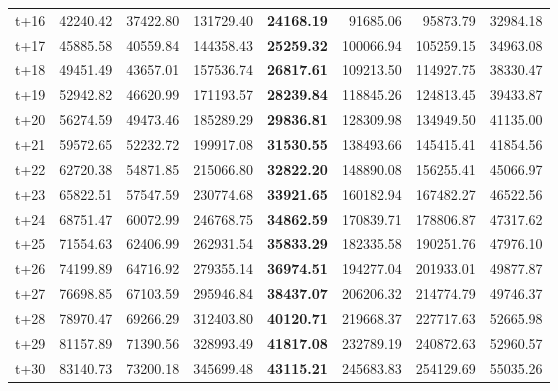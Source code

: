 \begin{table}[H]
\begin{tabular}{lrrrrrrr}
t+16  & 42240.42  & 37422.80  & 131729.40  & \textbf{24168.19}  & 91685.06  & 95873.79  & 32984.18  \\
t+17  & 45885.58  & 40559.84  & 144358.43  & \textbf{25259.32}  & 100066.94  & 105259.15  & 34963.08  \\
t+18  & 49451.49  & 43657.01  & 157536.74  & \textbf{26817.61}  & 109213.50  & 114927.75  & 38330.47  \\
t+19  & 52942.82  & 46620.99  & 171193.57  & \textbf{28239.84}  & 118845.26  & 124813.45  & 39433.87  \\
t+20  & 56274.59  & 49473.46  & 185289.29  & \textbf{29836.81}  & 128309.98  & 134949.50  & 41135.00  \\
t+21  & 59572.65  & 52232.72  & 199917.08  & \textbf{31530.55}  & 138493.66  & 145415.41  & 41854.56  \\
t+22  & 62720.38  & 54871.85  & 215066.80  & \textbf{32822.20}  & 148890.08  & 156255.41  & 45066.97  \\
t+23  & 65822.51  & 57547.59  & 230774.68  & \textbf{33921.65}  & 160182.94  & 167482.27  & 46522.56  \\
t+24  & 68751.47  & 60072.99  & 246768.75  & \textbf{34862.59}  & 170839.71  & 178806.87  & 47317.62  \\
t+25  & 71554.63  & 62406.99  & 262931.54  & \textbf{35833.29}  & 182335.58  & 190251.76  & 47976.10  \\
t+26  & 74199.89  & 64716.92  & 279355.14  & \textbf{36974.51}  & 194277.04  & 201933.01  & 49877.87  \\
t+27  & 76698.85  & 67103.59  & 295946.84  & \textbf{38437.07}  & 206206.32  & 214774.79  & 49746.37  \\
t+28  & 78970.47  & 69266.29  & 312403.80  & \textbf{40120.71}  & 219668.37  & 227717.63  & 52665.98  \\
t+29  & 81157.89  & 71390.56  & 328993.49  & \textbf{41817.08}  & 232789.19  & 240872.63  & 52960.57  \\
t+30  & 83140.73  & 73200.18  & 345699.48  & \textbf{43115.21}  & 245683.83  & 254129.69  & 55035.26  \\

\bottomrule
\end{tabular}
\end{table}
